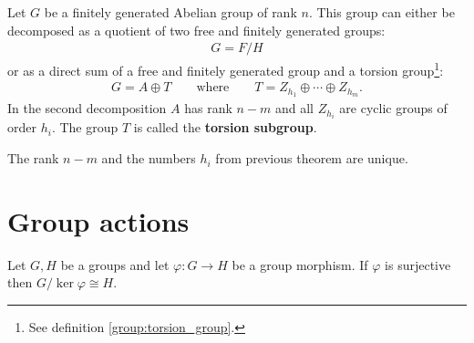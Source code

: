     \begin{property}\label{group:theorem:free_group}
        Let $G$ be a finitely generated Abelian group of rank $n$. This group can either be decomposed as a quotient of two free and finitely generated groups:
        \begin{gather}
            G = F/H
        \end{gather}
        or as a direct sum of a free and finitely generated group and a torsion group\footnote{See definition \ref{group:torsion_group}.}:
        \begin{gather}
            G = A\oplus T\qquad\text{where}\qquad T = Z_{h_1}\oplus\cdots\oplus Z_{h_m}.
        \end{gather}
        In the second decomposition $A$ has rank $n-m$ and all $Z_{h_i}$ are cyclic groups of order $h_i$. The group $T$ is called the \textbf{torsion subgroup}.
    \end{property}
    \begin{property}
        The rank $n-m$ and the numbers $h_i$ from previous theorem are unique.
    \end{property}

\section{Group actions}



    \begin{theorem}\label{group:theorem:first_isomorphism_theorem}
        Let $G, H$ be a groups and let $\varphi:G\rightarrow H$ be a group morphism. If $\varphi$ is surjective then $G/\ker\varphi\cong H$.
    \end{theorem}

